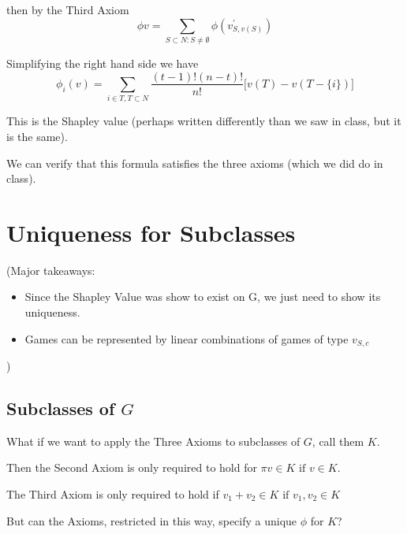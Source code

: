 \documentclass[
paper=128mm:96mm, %
fontsize=11pt, %
pagesize, %
parskip=half-, %
]{scrartcl} %
\theoremstyle{mythmstyle} %
\begin{document}
then by the Third Axiom
	\[ \phi{v} = \sum_{S \subset N: S \neq \emptyset}{\phi(v^{\prime}_{S, v(S)})} \]

\clearpage

Simplifying the right hand side we have
	\[ \phi_{i}(v) = \sum_{i \in T, T\subset N}{\frac{(t - 1)!(n - t)!}{n!} [ v(T) - v(T - \{i\})} ] \]

This is the Shapley value (perhaps written differently than we saw in class, but it is the same).

We can verify that this formula satisfies the three axioms (which we did do in class).

\clearpage

\section{Uniqueness for Subclasses}

(Major takeaways:
\begin{itemize}
\item Since the Shapley Value was show to exist on G, we just need to show its uniqueness.

\item Games can be represented by linear combinations of games of type $v_{S,c}$
\end{itemize}

)

\clearpage

\subsection{Subclasses of $G$}

What if we want to apply the Three Axioms to subclasses of $G$, call them $K$.

Then the Second Axiom is only required to hold for $\pi v \in K \text{ if } v \in K$.

The Third Axiom is only required to hold if $v_{1} + v_{2} \in K \text{ if } v_{1}, v_{2} \in K$

But can the Axioms, restricted in this way, specify a unique $\phi$ for $K$?

\clearpage
\end{document}
